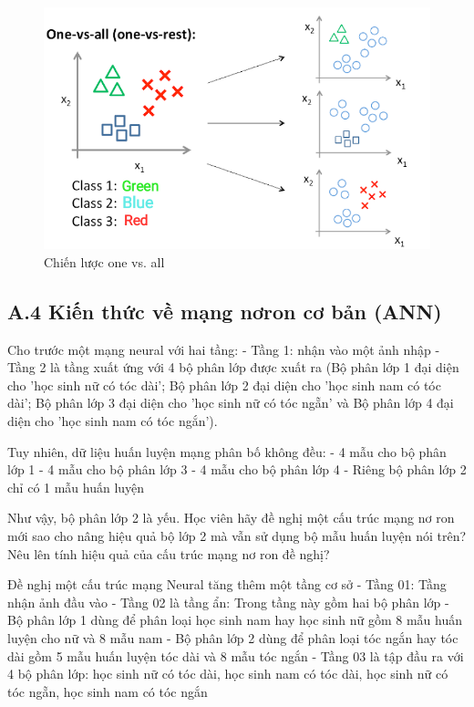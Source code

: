 \documentclass{article}
\begin{document}
	\begin{figure}[H]
		\centering
		\includegraphics[width=0.75\linewidth]{images/one_vs_all.png}
		\caption{Chiến lược one vs. all}
		\label{fig:writing-thesis}
	\end{figure}
	
	\subsection{A.4 Kiến thức về mạng nơron cơ bản (ANN)}
	\qquad Cho trước một mạng neural với hai tầng: 
	- Tầng 1: nhận vào một ảnh nhập
	- Tầng 2 là tầng xuất ứng với 4 bộ phân lớp được xuất ra (Bộ phân lớp 1 đại diện cho 'học sinh nữ có tóc dài'; Bộ phân lớp 2 đại diện cho 'học sinh nam có tóc dài'; Bộ phân lớp 3 đại diện cho 'học sinh nữ có tóc ngẵn' và Bộ phân lớp 4 đại diện cho 'học sinh nam có tóc ngắn').
	
	Tuy nhiên, dữ liệu huấn luyện mạng phân bố không đều:
	- 4 mẫu cho bộ phân lớp 1
	- 4 mẫu cho bộ phân lớp 3
	- 4 mẫu cho bộ phân lớp 4
	- Riêng bộ phân lớp 2 chỉ có 1 mẫu huấn luyện
	
	Như vậy, bộ phân lớp 2 là yếu. Học viên hãy đề nghị một cấu trúc mạng nơ ron mới sao cho nâng hiệu quả bộ lớp 2 mà vẫn sử dụng bộ mẫu huấn luyện nói trên? Nêu lên tính hiệu quả của cấu trúc mạng nơ ron đề nghị?
	
	Đề nghị một cấu trúc mạng Neural tăng thêm một tầng cơ sở
	- Tầng 01: Tầng nhận ảnh đầu vào
	- Tầng 02 là tầng ẩn: Trong tầng này gồm hai bộ phân lớp
	- Bộ phân lớp 1 dùng để phân loại học sinh nam hay học sinh nữ gồm 8 mẫu huấn luyện cho nữ và 8 mẫu nam
	- Bộ phân lớp 2 dùng để phân loại tóc ngắn hay tóc dài gồm 5 mẫu huấn luyện tóc dài và 8 mẫu tóc ngắn
	- Tầng 03 là tập đầu ra với 4 bộ phân lớp: học sinh nữ có tóc dài, học sinh nam có tóc dài, học sinh nữ có tóc ngẵn, học sinh nam có tóc ngắn
	
\end{document}
